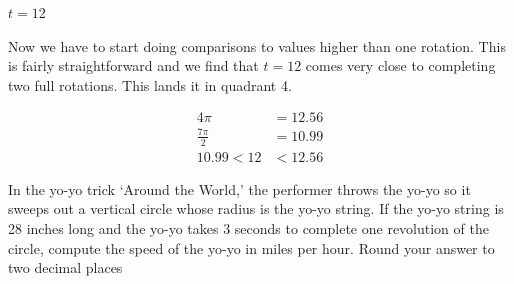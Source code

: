 \documentclass[10pt,letterpaper]{amspset}
\begin{document}
\begin{problem} [49.]
$t = 12$
\end{problem}

\begin{solution}
Now we have to start doing comparisons to values higher than one rotation. This is fairly straightforward and we find that $t=12$ comes very close to completing two full rotations. This lands it in quadrant 4.

\begin{align}
    4\pi &= 12.56 \\
    \frac{7\pi}{2} &= 10.99 \\
    10.99 < 12 &< 12.56
\end{align} 

\begin{center}
\end{center}

\end{solution}


\pagebreak


\begin{problem}[52.]
In  the  yo-yo  trick  ‘Around  the  World,’  the  performer  throws  the  yo-yo  so  it  sweeps  out  a vertical circle whose radius is the yo-yo string.  If the yo-yo string is 28 inches long and the yo-yo takes 3 seconds to complete one revolution of the circle, compute the speed of the yo-yo in miles per hour.  Round your answer to two decimal places
\end{problem}
\end{document}
